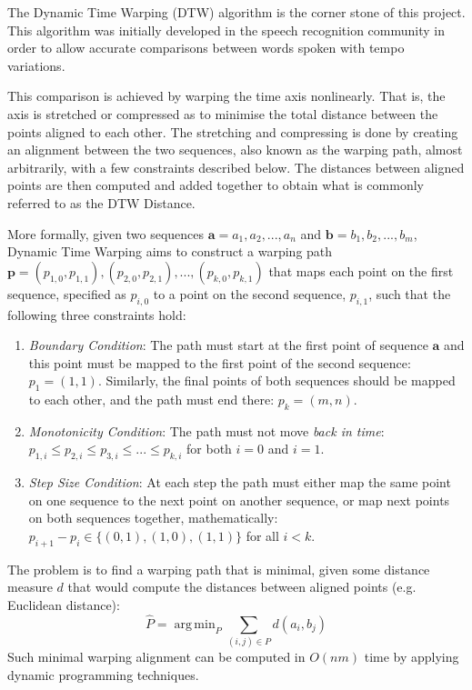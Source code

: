\documentclass[parskip]{cs4rep}
\DeclareMathOperator*{\argmin}{arg\,min}
\begin{document}
The Dynamic Time Warping (DTW) algorithm is the corner stone of this project. This algorithm was initially developed in the speech recognition community in order to allow accurate comparisons between words spoken with tempo variations. 

This comparison is achieved by warping the time axis nonlinearly. That is, the axis is stretched or compressed as to minimise the total distance between the points aligned to each other. The stretching and compressing is done by creating an alignment between the two sequences, also known as the warping path, almost arbitrarily, with a few constraints described below. The distances between aligned points are then computed and added together to obtain what is commonly referred to as the DTW Distance.

More formally, given two sequences $\mathbf{a} = a_1, a_2, ..., a_n$ and $\mathbf{b} = b_1, b_2, ..., b_m$, Dynamic Time Warping aims to construct a warping path\\
$\mathbf{p} = { (p_{1,0}, p_{1,1}), (p_{2,0}, p_{2,1}), ..., (p_{k,0}, p_{k, 1}) }$ that maps each point on the first sequence, specified as $p_{i,0}$ to a point on the second sequence, $p_{i,1}$, such that the following three constraints hold:

\begin{enumerate}
\item \emph{Boundary Condition}: The path must start at the first point of sequence $\mathbf{a}$ and this point must be mapped to the first point of the second sequence: $p_1 = (1,1)$. Similarly, the final points of both sequences should be mapped to each other, and the path must end there: $p_k = (m, n).$ 
\item \emph{Monotonicity Condition}: The path must not move \emph{back in time}: 
    $p_{1,i} \le p_{2,i} \le p_{3,i} \le ... \le p_{k, i}$ for both $i=0$ and $i=1$.
\item \emph{Step Size Condition}: At each step the path must either map the same point on one sequence to the next point on another sequence, or map next points on both sequences together, mathematically:
    $p_{i+1} - p_{i} \in \{(0,1), (1,0), (1,1)\}$ for all $i < k$.
\end{enumerate}

The problem is to find a warping path that is minimal, given some distance measure $d$ that would compute the distances between aligned points (e.g. Euclidean distance): 
\begin{equation}
\hat{P} = \argmin_P \sum_{(i,j) \in P} d(a_i, b_j)
\end{equation}
Such minimal warping alignment can be computed in $O(nm)$ time by applying dynamic programming techniques. 
\end{document}
